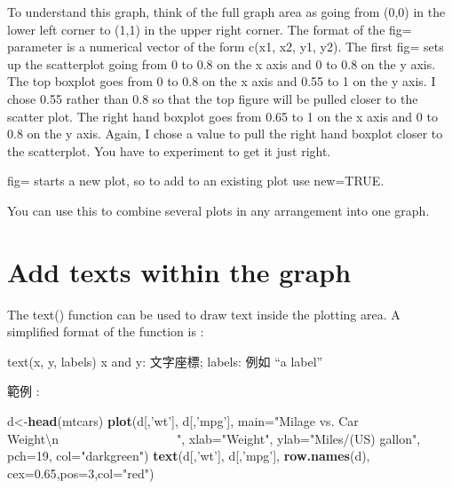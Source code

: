 \documentclass[]{book}
\newenvironment{Shaded}{\begin{snugshade}}{\end{snugshade}}
\newcommand{\KeywordTok}[1]{\textcolor[rgb]{0.13,0.29,0.53}{\textbf{#1}}}
\newcommand{\DataTypeTok}[1]{\textcolor[rgb]{0.13,0.29,0.53}{#1}}
\newcommand{\DecValTok}[1]{\textcolor[rgb]{0.00,0.00,0.81}{#1}}
\newcommand{\FloatTok}[1]{\textcolor[rgb]{0.00,0.00,0.81}{#1}}
\newcommand{\CharTok}[1]{\textcolor[rgb]{0.31,0.60,0.02}{#1}}
\newcommand{\StringTok}[1]{\textcolor[rgb]{0.31,0.60,0.02}{#1}}
\newcommand{\NormalTok}[1]{#1}
\theoremstyle{definition}
\theoremstyle{definition}
\theoremstyle{definition}
\theoremstyle{remark}
\begin{document}
To understand this graph, think of the full graph area as going from
(0,0) in the lower left corner to (1,1) in the upper right corner. The
format of the fig= parameter is a numerical vector of the form c(x1, x2,
y1, y2). The first fig= sets up the scatterplot going from 0 to 0.8 on
the x axis and 0 to 0.8 on the y axis. The top boxplot goes from 0 to
0.8 on the x axis and 0.55 to 1 on the y axis. I chose 0.55 rather than
0.8 so that the top figure will be pulled closer to the scatter plot.
The right hand boxplot goes from 0.65 to 1 on the x axis and 0 to 0.8 on
the y axis. Again, I chose a value to pull the right hand boxplot closer
to the scatterplot. You have to experiment to get it just right.

fig= starts a new plot, so to add to an existing plot use new=TRUE.

You can use this to combine several plots in any arrangement into one
graph.

\section{Add texts within the graph}\label{add-texts-within-the-graph}

The text() function can be used to draw text inside the plotting area. A
simplified format of the function is :

text(x, y, labels) x and y: 文字座標; labels: 例如 ``a label''

範例 :

\begin{Shaded}
\begin{Highlighting}[]
\NormalTok{d<-}\KeywordTok{head}\NormalTok{(mtcars)}
\KeywordTok{plot}\NormalTok{(d[,}\StringTok{'wt'}\NormalTok{], d[,}\StringTok{'mpg'}\NormalTok{], }
     \DataTypeTok{main=}\StringTok{"Milage vs. Car Weight}\CharTok{\textbackslash{}n}\StringTok{~~~~~~~~~~~~~~~~~~~"}\NormalTok{,}
      \DataTypeTok{xlab=}\StringTok{"Weight"}\NormalTok{, }\DataTypeTok{ylab=}\StringTok{"Miles/(US) gallon"}\NormalTok{,}
      \DataTypeTok{pch=}\DecValTok{19}\NormalTok{, }\DataTypeTok{col=}\StringTok{"darkgreen"}\NormalTok{)}
\KeywordTok{text}\NormalTok{(d[,}\StringTok{'wt'}\NormalTok{], d[,}\StringTok{'mpg'}\NormalTok{],  }\KeywordTok{row.names}\NormalTok{(d),     }\DataTypeTok{cex=}\FloatTok{0.65}\NormalTok{,}\DataTypeTok{pos=}\DecValTok{3}\NormalTok{,}\DataTypeTok{col=}\StringTok{"red"}\NormalTok{) }
\end{Highlighting}
\end{Shaded}
\end{document}
